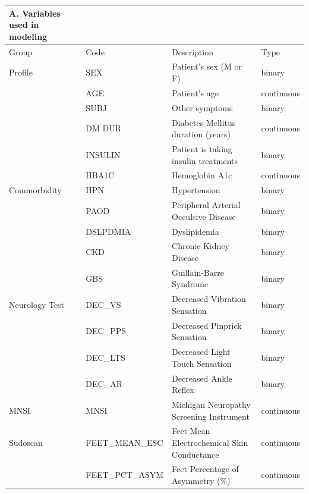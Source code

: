 \documentclass[pdflatex,sn-vancouver-num]{sn-jnl}
\begin{document}
\begin{table}[h!]
\centering
\footnotesize
\begin{tabular}{llll}
\toprule
\textbf{A. Variables used in modeling} & & & \\
\midrule
\hspace{0.3cm} Group & Code & Description  & Type\\
\midrule
\hspace{0.3cm} Profile      & SEX & Patient's sex (M or F) & binary \\
             & AGE & Patient's age  & continuous \\
             & SUBJ & Other symptoms  & binary \\
             & DM DUR & Diabetes Mellitus duration (years) & continuous \\
             & INSULIN & Patient is taking insulin treatments & binary \\
             & HBA1C & Hemoglobin A1c & continuous  \\
\midrule
\hspace{0.3cm} Commorbidity & HPN & Hypertension  & binary \\
             & PAOD & Peripheral Arterial Occulsive Disease  & binary \\
             & DSLPDMIA & Dyslipidemia & binary \\
             & CKD & Chronic Kidney Disease  & binary \\
             & GBS & Guillain-Barre Syndrome  & binary \\
\midrule
\hspace{0.3cm} Neurology Test   & DEC\_VS & Decreased Vibration Sensation & binary \\
                 & DEC\_PPS & Decreased Pinprick Sensation  & binary \\
                 & DEC\_LTS & Decreased Light Touch Sensation  & binary \\
                 & DEC\_AR & Decreased Ankle Reflex  & binary \\
\midrule
\hspace{0.3cm} MNSI & MNSI & Michigan Neuropathy Screening Instrument  & continuous \\
\midrule
\hspace{0.3cm} Sudoscan & FEET\_MEAN\_ESC & Feet Mean Electrochemical Skin Conductance & continuous  \\
         & FEET\_PCT\_ASYM & Feet Percentage of Asymmetry (\%) & continuous  \\

\end{tabular}
\end{table}
\end{document}
